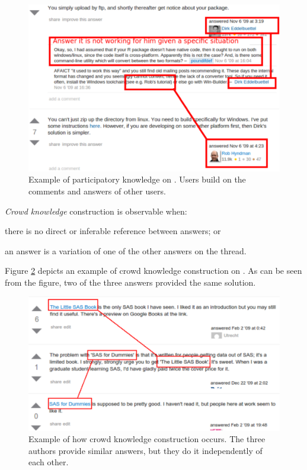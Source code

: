     \begin{figure}[!htb]
        \centering
        \includegraphics[width=\columnwidth]{Figures/SO-PKimg5}
        \caption{Example of participatory knowledge on \SO. Users build on the comments and answers of other users.}
        \label{fig:SO-PK1}
        \vspace{-3mm}
    \end{figure}

\textit{Crowd knowledge} construction is observable when:
  \begin{enumerate*}[label=(\arabic*)]
    \item there is no direct or inferable reference between answers; or
    \item an answer is a variation of one of the other answers on the thread.
  \end{enumerate*}
Figure \ref{fig:CKC_MLSO} depicts an example of crowd knowledge construction on \SO. As can be seen from the figure, two of the three answers provided the same solution. 

    \begin{figure} [!htb]
        \centering
        \includegraphics[width=\columnwidth]{Figures/SO-CSimg2}
        \caption{Example of how crowd knowledge construction occurs. The three authors provide similar answers, but they do it independently of each other.}
        \label{fig:CKC_MLSO}
\vspace{-3mm}
    \end{figure}

